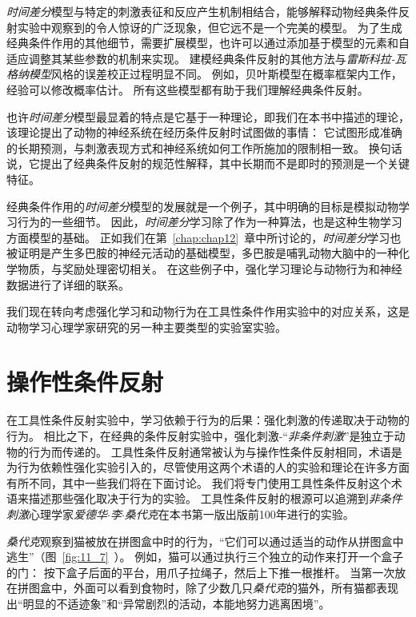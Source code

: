 \textit{时间差分}模型与特定的刺激表征和反应产生机制相结合，能够解释动物经典条件反射实验中观察到的令人惊讶的广泛现象，但它远不是一个完美的模型。
为了生成经典条件作用的其他细节，需要扩展模型，也许可以通过添加基于模型的元素和自适应调整其某些参数的机制来实现。
建模经典条件反射的其他方法与\textit{雷斯科拉-瓦格纳模型}风格的误差校正过程明显不同。
例如，贝叶斯模型在概率框架内工作，经验可以修改概率估计。
所有这些模型都有助于我们理解经典条件反射。


也许\textit{时间差分}模型最显着的特点是它基于一种理论，即我们在本书中描述的理论，该理论提出了动物的神经系统在经历条件反射时试图做的事情：
它试图形成准确的长期预测，与刺激表现方式和神经系统如何工作所施加的限制相一致。
换句话说，它提出了经典条件反射的规范性解释，其中长期而不是即时的预测是一个关键特征。


经典条件作用的\textit{时间差分}模型的发展就是一个例子，其中明确的目标是模拟动物学习行为的一些细节。
因此，\textit{时间差分}学习除了作为一种算法，也是这种生物学习方面模型的基础。
正如我们在第~\ref{chap:chap12}~章中所讨论的，\textit{时间差分}学习也被证明是产生多巴胺的神经元活动的基础模型，多巴胺是哺乳动物大脑中的一种化学物质，与奖励处理密切相关。
在这些例子中，强化学习理论与动物行为和神经数据进行了详细的联系。


我们现在转向考虑强化学习和动物行为在工具性条件作用实验中的对应关系，这是动物学习心理学家研究的另一种主要类型的实验室实验。


\section{操作性条件反射} \label{sec:instrumental_conditioning}

在工具性条件反射实验中，学习依赖于行为的后果：强化刺激的传递取决于动物的行为。
相比之下，在经典的条件反射实验中，强化刺激-“\textit{非条件刺激}”是独立于动物的行为而传递的。
工具性条件反射通常被认为与操作性条件反射相同，术语是为行为依赖性强化实验引入的\cite{skinner2019behavior}，尽管使用这两个术语的人的实验和理论在许多方面有所不同，其中一些我们将在下面讨论。
我们将专门使用工具性条件反射这个术语来描述那些强化取决于行为的实验。
工具性条件反射的根源可以追溯到\textit{非条件刺激}心理学家\textit{爱德华$\cdot$李$\cdot$桑代克}在本书第一版出版前100年进行的实验。


\textit{桑代克}观察到猫被放在拼图盒中时的行为，“它们可以通过适当的动作从拼图盒中逃生”（图~\ref{fig:11_7}~）。
例如，猫可以通过执行三个独立的动作来打开一个盒子的门：
按下盒子后面的平台，用爪子拉绳子，然后上下推一根推杆。
当第一次放在拼图盒中，外面可以看到食物时，除了少数几只\textit{桑代克}的猫外，所有猫都表现出“明显的不适迹象”和“异常剧烈的活动，本能地努力逃离困境”\cite{thorndike1898animal}。


